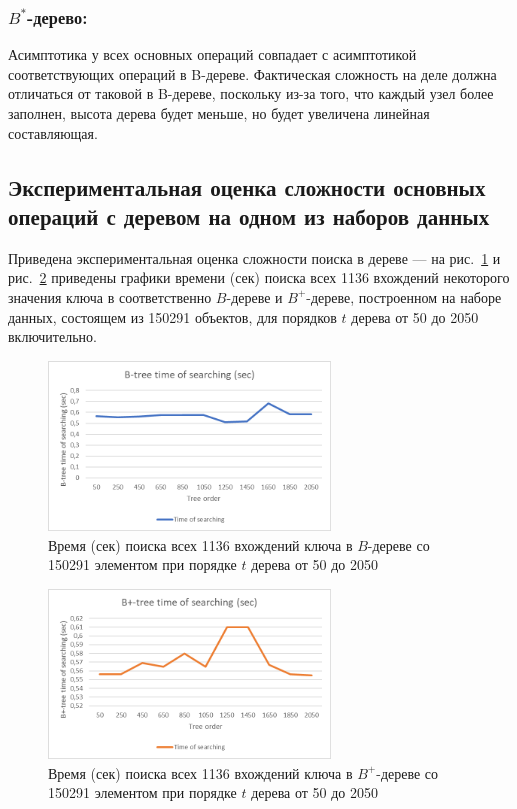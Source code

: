 \documentclass{llncs}
\begin{document}
    \vspace{-1em}
    
    \subsubsection{$B^*$-дерево:}
    
    Асимптотика у всех основных операций совпадает с асимптотикой соответствующих операций в B-дереве. Фактическая сложность на деле должна отличаться от таковой в B-дереве, поскольку из-за того, что каждый узел более заполнен, высота дерева будет меньше, но будет увеличена линейная составляющая.
    
    \vspace{-1em}
	
	\subsection{Экспериментальная оценка сложности основных операций с деревом на одном из наборов данных}
	
	Приведена экспериментальная оценка сложности поиска в дереве --- на рис.~\ref{fig:BTreeSearchTime} и рис.~\ref{fig:BPlusTreeSearchTime} приведены графики времени (сек) поиска всех 1136 вхождений некоторого значения ключа в соответственно $B$-дереве и $B^+$-дереве, построенном на наборе данных, состоящем из 150291 объектов, для порядков $t$ дерева от 50 до 2050 включительно.
	
	\begin{figure}[h!]
		\centering
		\includegraphics[width=7.5cm]{BTreeSearchTime}
		\caption{Время (сек) поиска всех 1136 вхождений ключа в $B$-дереве со 150291 элементом при порядке $t$ дерева от 50 до 2050}
		\label{fig:BTreeSearchTime}
	\end{figure}
    
    \begin{figure}[h!]
    	\centering
    	\includegraphics[width=7.5cm]{BPlusTreeSearchTime}
    	\caption{Время (сек) поиска всех 1136 вхождений ключа в $B^+$-дереве со 150291 элементом при порядке $t$ дерева от 50 до 2050}
    	\label{fig:BPlusTreeSearchTime}
    \end{figure}
    
\end{document}
